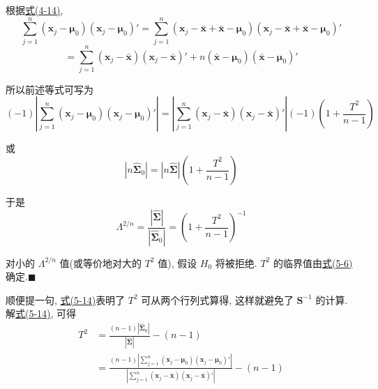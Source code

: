 根据\hyperref[eq:4-14]{式(4-14)},
\[
\sum_{j=1}^{n}(\mathbf{x}_j-\boldsymbol{\mu}_0)(\mathbf{x}_j-\boldsymbol{\mu}_0)'=\sum_{j=1}^{n}(\mathbf{x}_j-\bar{\mathbf{x}}+\bar{\mathbf{x}}-\boldsymbol{\mu}_0)(\mathbf{x}_j-\bar{\mathbf{x}}+\bar{\mathbf{x}}-\boldsymbol{\mu}_0)'
\]
\[
=\sum_{j=1}^{n}(\mathbf{x}_j-\bar{\mathbf{x}})(\mathbf{x}_j-\bar{\mathbf{x}})'+n(\bar{\mathbf{x}}-\boldsymbol{\mu}_0)(\bar{\mathbf{x}}-\boldsymbol{\mu}_0)'
\]

所以前述等式可写为
\[
(-1)\left|\sum_{j=1}^{n}(\mathbf{x}_j-\boldsymbol{\mu}_0)(\mathbf{x}_j-\boldsymbol{\mu}_0)'\right|=\left|\sum_{j=1}^{n}(\mathbf{x}_j-\bar{\mathbf{x}})(\mathbf{x}_j-\bar{\mathbf{x}})'\right|(-1)\left(1+\frac{T^2}{n-1}\right)
\]

或
\[
|n\hat{\boldsymbol{\Sigma}}_0|=|n\hat{\boldsymbol{\Sigma}}|\left(1+\frac{T^2}{n-1}\right)
\]

于是
\label{eq:5-14}
\begin{equation}
\Lambda^{2/n}=\frac{|\hat{\boldsymbol{\Sigma}}|}{|\hat{\boldsymbol{\Sigma}}_0|}=\left(1+\frac{T^2}{n-1}\right)^{-1} \tag{5-14}
\end{equation}

对小的 $\Lambda^{2/n}$ 值(或等价地对大的 $T^2$ 值), 假设 $H_0$ 将被拒绝. $T^2$ 的临界值由\hyperref[eq:5-6]{式(5-6)}确定.\hfill$\blacksquare$

顺便提一句, \hyperref[eq:5-14]{式(5-14)}表明了 $T^2$ 可从两个行列式算得, 这样就避免了 $\mathbf{S}^{-1}$ 的计算. 解\hyperref[eq:5-14]{式(5-14)}, 可得
\label{eq:5-15}
\begin{equation}
\begin{aligned}
T^2&=\frac{(n-1)|\hat{\boldsymbol{\Sigma}}_0|}{|\hat{\boldsymbol{\Sigma}}|}-(n-1)\\
&=\frac{(n-1)\left|\sum_{j=1}^{n}(\mathbf{x}_j-\boldsymbol{\mu}_0)(\mathbf{x}_j-\boldsymbol{\mu}_0)'\right|}{\left|\sum_{j=1}^{n}(\mathbf{x}_j-\bar{\mathbf{x}})(\mathbf{x}_j-\bar{\mathbf{x}})'\right|}-(n-1)
\end{aligned} \tag{5-15}
\end{equation}
